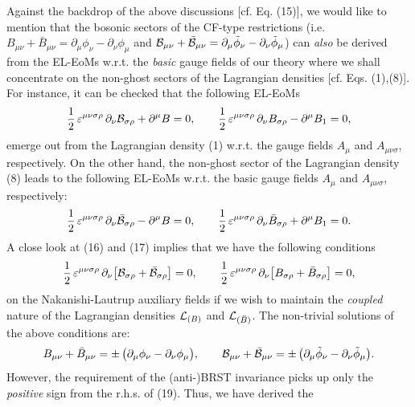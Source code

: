 \documentclass[12pt]{article}
\begin{document}
Against the backdrop of the above discussions [cf. Eq. (15)], we would like to mention that the bosonic sectors of the CF-type restrictions (i.e.
$B_{\mu\nu} + \bar B_{\mu\nu} = \partial_\mu \phi_\nu - \partial_\nu \phi_\mu$ and
${\cal B}_{\mu\nu} + \bar {\cal B}_{\mu\nu} = \partial_\mu \tilde \phi_\nu - \partial_\nu \tilde \phi_\mu$) can {\it also} be derived
from the EL-EoMs w.r.t. the {\it basic} gauge fields of our theory where we shall concentrate on the non-ghost sectors of the
Lagrangian densities [cf. Eqs. (1),(8)]. For instance, it can be checked that the following EL-EoMs
\begin{eqnarray}\label{16}
\dfrac{1}{2}\, \varepsilon^{\mu\nu\sigma\rho} \, \partial_\nu {\cal B}_{\sigma\rho} + \partial^\mu B = 0, \qquad
\dfrac{1}{2}\, \varepsilon^{\mu\nu\sigma\rho} \, \partial_\nu B_{\sigma\rho} - \partial^\mu B_1 = 0,
\end{eqnarray}
emerge out from the Lagrangian density (1) w.r.t. the gauge fields $A_\mu$ and $A_{\mu\nu\sigma}$, respectively. On the other hand, the
non-ghost sector of the Lagrangian density (8) leads to the following EL-EoMs w.r.t. 
the basic gauge fields $A_\mu$ and $A_{\mu\nu\sigma}$, respectively:
\begin{eqnarray}\label{17}
\dfrac{1}{2}\, \varepsilon^{\mu\nu\sigma\rho} \, \partial_\nu \bar {\cal B}_{\sigma\rho} - \partial^\mu B = 0, \qquad
\dfrac{1}{2}\, \varepsilon^{\mu\nu\sigma\rho} \, \partial_\nu \bar B_{\sigma\rho} + \partial^\mu B_1 = 0.
\end{eqnarray}
 A close look at (16) and (17) implies that we have the following conditions
\begin{eqnarray}\label{18}
\dfrac{1}{2}\, \varepsilon^{\mu\nu\sigma\rho} \, \partial_\nu \big [ {\cal B}_{\sigma\rho} +  \bar {\cal B}_{\sigma\rho} \big ]= 0, \qquad
\dfrac{1}{2}\, \varepsilon^{\mu\nu\sigma\rho} \, \partial_\nu \big [ B_{\sigma\rho} + \bar B_{\sigma\rho} \big ] = 0,
\end{eqnarray}
on the Nakanishi-Lautrup auxiliary fields if we wish to maintain the {\it coupled} nature of the 
Lagrangian densities ${\cal L}_{(B)} $ and ${\cal L}_{(\bar B)} $.
The non-trivial solutions of the above conditions are:
\begin{eqnarray}\label{19}
B_{\mu\nu} + \bar B_{\mu\nu} = \pm \,\big (\partial_\mu \phi_\nu - \partial_\nu \phi_\mu \big ), \qquad
{\cal B}_{\mu\nu} + \bar {\cal B}_{\mu\nu} = \pm \,\big (\partial_\mu \tilde \phi_\nu - \partial_\nu \tilde \phi_\mu \big ).
\end{eqnarray}
However, the requirement of the (anti-)BRST invariance picks up only the {\it positive} sign from the r.h.s. of (19). Thus, we have derived the
\end{document}
